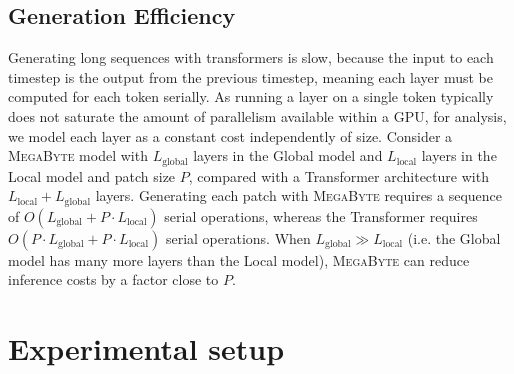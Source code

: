 \documentclass{article}
\newcommand{\fastslow}[0]{\textsc{MegaByte}\xspace}
\newcommand{\megabyte}[0]{\fastslow}
\newcommand{\Lglobal}[0]{L_{\text{global}}}
\newcommand{\Llocal}[0]{L_{\text{local}}}
\theoremstyle{plain}
\theoremstyle{definition}
\theoremstyle{remark}
\begin{document}



\subsection{Generation Efficiency}
Generating long sequences with transformers is slow, because the input to each timestep is the output from the previous timestep, meaning each layer must be computed for each token serially. As running a layer on a single token typically does not saturate the amount of parallelism available within a GPU, for analysis, we model each layer as a constant cost independently of size. Consider a \megabyte model with $\Lglobal$ layers in the Global model and $\Llocal$ layers in the Local model and patch size $P$, compared with a Transformer architecture with $\Llocal+\Lglobal$ layers. Generating each patch with \megabyte requires a sequence of $O(\Lglobal+P\cdot \Llocal)$ serial operations, whereas the Transformer requires $O(P\cdot \Lglobal+P\cdot \Llocal)$ serial operations. When $\Lglobal\gg \Llocal$ (i.e. the Global model has many more layers than the Local model), \megabyte can reduce inference costs by a factor close to $P$.



\section{Experimental setup}
\label{sec:exp}
\end{document}

